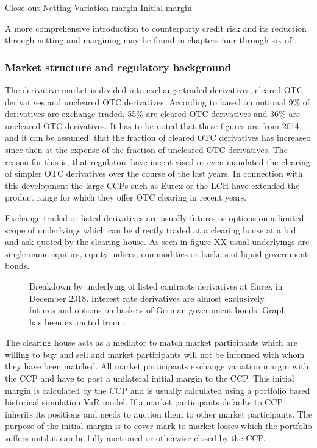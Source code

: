 \documentclass[12pt,a4paper]{article}
\begin{document}
Close-out Netting
Variation margin
Initial margin

A more comprehensive introduction to counterparty credit risk and its reduction through netting and margining may be found in chapters four through six of \citep{gregory2015xva}.
\subsubsection{Market structure and regulatory background}
The derivative market is divided into exchange traded derivatives, cleared OTC derivatives and uncleared OTC derivatives. According to \citep[Figure~3.2]{gregory2015xva} based on notional 9\% of derivatives are exchange traded, 55\% are cleared OTC derivatives and 36\% are uncleared OTC derivatives. It has to be noted that these figures are from 2014 and it can be assumed, that the fraction of cleared OTC derivatives has increased since then at the expense of the fraction of uncleared OTC derivatives. The reason for this is, that regulators have incentivised or even mandated the clearing of simpler OTC derivatives over the course of the last years. In connection with this development the large CCPs such as Eurex or the LCH have extended the product range for which they offer OTC clearing in recent years.

Exchange traded or listed derivatives are usually futures or options on a limited scope of underlyings which can be directly traded at a clearing house at a bid and ask quoted by the clearing house. As seen in figure XX usual underlyings are single name equities, equity indices, commodities or baskets of liquid government bonds. 
\begin{figure}
	\centering
	\def\svgwidth{\columnwidth}
    
    \caption{Breakdown by underlying of listed contracts derivatives at Eurex in December 2018. Interest rate derivatives are almost exclusively futures and options on baskets of German government bonds. Graph has been extracted from \citep{EurexDec2018}.}
\end{figure}
The clearing house acts as a mediator to match market participants which are willing to buy and sell and market participants will not be informed with whom they have been matched. All market participants exchange variation margin with the CCP and have to post a unilateral initial margin to the CCP. This initial margin is calculated by the CCP and is usually calculated using a portfolio based historical simulation VaR model. If a market participants defaults to CCP inherits its positions and needs to auction them to other market participants. The purpose of the initial margin is to cover mark-to-market losses which the portfolio suffers until it can be fully auctioned or otherwise closed by the CCP.
\end{document}
